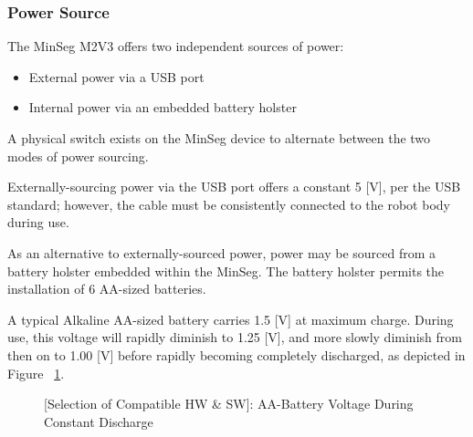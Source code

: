 \documentclass[crop=false,float=true,class=scrreprt]{standalone}
\begin{document}
\subsubsection{Power Source}
\label{SEC:preliminaryDecisions:selectionHardwareSoftware:hardware:components:power}

The MinSeg M2V3 offers two independent sources of power:

\begin{itemize}[leftmargin=*, itemsep=-1.0em]
\item External power via a USB port
\item Internal power via an embedded battery holster
\end{itemize}

A physical switch exists on the MinSeg device to alternate between the two modes of power sourcing.





Externally-sourcing power via the USB port offers a constant 5 [V], per the USB standard;
however, the cable must be consistently connected to the robot body during use.





As an alternative to externally-sourced power, 
power may be sourced from a battery holster embedded within the MinSeg.
The battery holster permits the installation of 6 AA-sized batteries.

A typical Alkaline AA-sized battery carries 1.5 [V] at maximum charge.
During use, this voltage will rapidly diminish to \raisebox{-0.75ex}{\textasciitilde}1.25 [V],
and more slowly diminish from then on to \raisebox{-0.75ex}{\textasciitilde}1.00 [V]
before rapidly becoming completely discharged, as depicted in Figure~%
\ref{FIG:preliminaryDecisions:selectionHardwareSoftware:hardware:components:power:batteryDrainage}.


\vspace*{+1.0em}
\begin{figure}[H]%
\small
\centering%
%
\caption[{[Selection of Compatible HW \& SW]: AA-Battery Voltage During Constant Discharge}]%
        {{[Selection of Compatible HW \& SW]: AA-Battery Voltage During Constant Discharge~%
           \cite{REF:online:powerstream:batteryDrainage}%
           \label{FIG:preliminaryDecisions:selectionHardwareSoftware:hardware:components:power:batteryDrainage}%
        }}%
\end{figure}
\vspace*{-1.0em}
\end{document}
